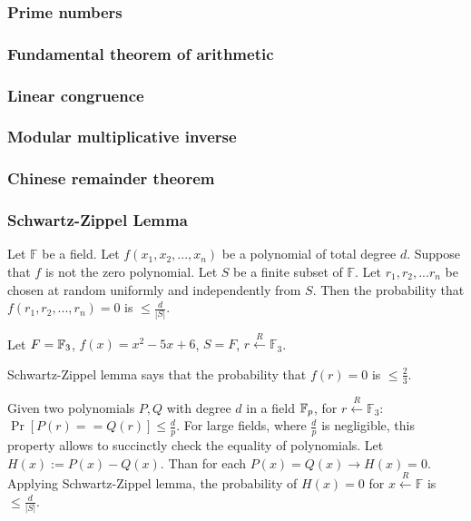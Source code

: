\documentclass[../lecture-notes.tex]{subfiles}
\begin{document}
\subsubsection{Prime numbers}

\subsubsection{Fundamental theorem of arithmetic}

\subsubsection{Linear congruence}

\subsubsection{Modular multiplicative inverse}

\subsubsection{Chinese remainder theorem}

\subsubsection{Schwartz-Zippel Lemma}

\begin{lemma}\label{lemma:sz}
Let $\mathbb{F}$ be a field. Let $f(x_1, x_2, ..., x_n)$ be a polynomial of total degree $d$. Suppose that $f$ is not the zero polynomial. Let $S$ be
a finite subset of $\mathbb{F}$. Let $r_1, r_2, ... r_n$ be chosen at random uniformly and independently from $S$. Then the probability that 
$f(r_1, r_2, ..., r_n) = 0$ is $\le \frac{d}{|S|}$.
\end{lemma}

\begin{example}
Let $F = \mathbb{F}_3$, $f(x) = x^2 - 5x + 6$, $S = F$, $r \xleftarrow{R} \mathbb{F}_3$.

Schwartz-Zippel lemma says that the probability that $f(r) = 0$ is $\le \frac{2}{3}$.
\end{example}

Given two polynomials $P, Q$ with  degree $d$ in a field $\mathbb{F}_p$, for $r \xleftarrow{R} \mathbb{F}_3$: $\Pr[P(r) == Q(r)] \le \frac{d}{p}$.
For large fields, where  $\frac{d}{p}$ is negligible, this property allows to succinctly check the equality of polynomials.
Let $H(x) := P(x) - Q(x)$. Than for each $P(x) = Q(x) \rightarrow H(x) = 0$. Applying Schwartz-Zippel lemma, 
the probability of $H(x) = 0$ for $x \xleftarrow{R} \mathbb{F} $ is $\le \frac{d}{|S|}$.
\end{document}
